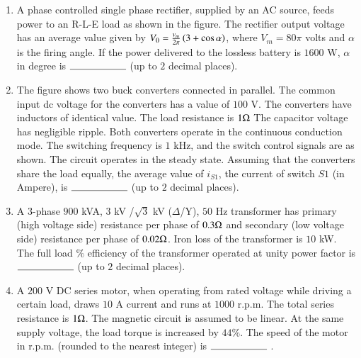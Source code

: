 \documentclass[journal,12pt,onecolumn]{IEEEtran}
\theoremstyle{remark}
\begin{document}
\begin{enumerate}[start=40]
        \item A phase controlled single phase rectifier, supplied by an AC source, feeds power to an R-L-E load as shown in the figure. The rectifier output voltage has an average value given by $V_0=\frac{v_m}{2\pi}\left(3+\cos{\alpha}\right)$, where $V_m=80\pi$ volts and $\alpha$ is the firing angle. If the power delivered to the lossless battery is $1600$ W, $\alpha$ in degree is $\rule{2cm}{0.4pt}$ (up to $2$ decimal places).\\
\begin{figure}[H]
    \centering
\end{figure}
		

	\item The figure shows two buck converters connected in parallel. The common input dc voltage for the converters has a value of $100$ V. The converters have inductors of identical value. The load resistance is $1\ohm$ The capacitor voltage has negligible ripple. Both converters operate in the continuous conduction mode. The switching frequency is $1$ kHz, and the switch control signals are as shown. The circuit operates in the steady state. Assuming that the converters share the load equally, the average value of $i_{S1}$, the current of switch $S1$ (in Ampere), is $\rule{2cm}{0.4pt}$ (up to $2$ decimal places).\\
\begin{figure}[H]
    \centering
\end{figure}
		

	\item A $3$-phase $900$ kVA, $3$ kV /$\sqrt{3}$ kV ($\Delta$/Y), $50$ Hz transformer has primary (high voltage side) resistance per phase of $0.3 \ohm$ and secondary (low voltage side) resistance per phase of $0.02 \ohm$. Iron loss of the transformer is $10$ kW. The full load $\%$ efficiency of the transformer operated at unity power factor is $\rule{2cm}{0.4pt}$ (up to $2$ decimal places).\\

	\item A $200$ V DC series motor, when operating from rated voltage while driving a certain load, draws $10$ A current and runs at $1000$ r.p.m. The total series resistance is $1\ohm$. The magnetic circuit is assumed to be linear. At the same supply voltage, the load torque is increased by $44\%$. The speed of the motor in r.p.m. (rounded to the nearest integer) is $\rule{2cm}{0.4pt}$ .



\end{enumerate}
\end{document}
